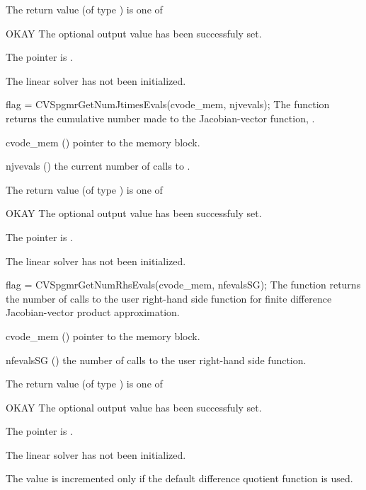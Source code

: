 {
  The return value  (of type ) is one of
  \begin{args}
  \item[OKAY] 
    The optional output value has been successfuly set.
  \item[\Id{LIN\_NO\_MEM}]
    The  pointer is .
  \item[\Id{LIN\_NO\_LMEM}]
    The {\cvspgmr} linear solver has not been initialized.
  \end{args}
}
{}
{
  flag = CVSpgmrGetNumJtimesEvals(cvode\_mem, njvevals);
}
{
  The function  returns the
  cumulative number made to the Jacobian-vector function,
  .
}
{
  \begin{args}
  \item[cvode\_mem] ()
    pointer to the {\cvode} memory block.
  \item[njvevals] ()
    the current number of calls to .
  \end{args}
}
{
  The return value  (of type ) is one of
  \begin{args}
  \item[OKAY] 
    The optional output value has been successfuly set.
  \item[\Id{LIN\_NO\_MEM}]
    The  pointer is .
  \item[\Id{LIN\_NO\_LMEM}]
    The {\cvspgmr} linear solver has not been initialized.
  \end{args}
}
{}
{
  flag = CVSpgmrGetNumRhsEvals(cvode\_mem, nfevalsSG);
}
{
  The function  returns the
  number of calls to the user right-hand side function for
  finite difference Jacobian-vector product approximation.
}
{
  \begin{args}
  \item[cvode\_mem] ()
    pointer to the {\cvode} memory block.
  \item[nfevalsSG] ()
    the number of calls to the user right-hand side function.
  \end{args}
}
{
  The return value  (of type ) is one of
  \begin{args}
  \item[OKAY] 
    The optional output value has been successfuly set.
  \item[\Id{LIN\_NO\_MEM}]
    The  pointer is .
  \item[\Id{LIN\_NO\_LMEM}]
    The {\cvspgmr} linear solver has not been initialized.
  \end{args}
}
{
  The value  is incremented only if the default 
   difference quotient function is used.
}

